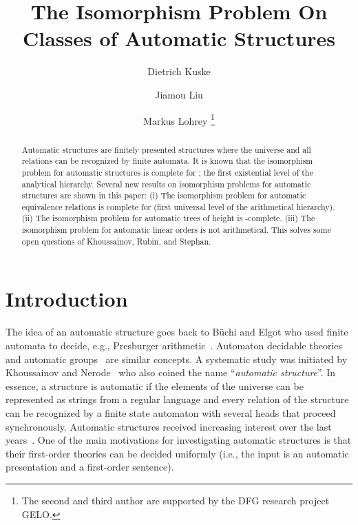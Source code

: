 \documentclass[envcountsame]{llncs}
\begin{document}
\title{The Isomorphism Problem On Classes of Automatic Structures}
\author{Dietrich Kuske \and Jiamou Liu \and  Markus Lohrey
\thanks{The second and third author are supported by the DFG  research project GELO.}
}

\maketitle
\pagestyle{plain}

\begin{abstract}
Automatic structures are finitely presented structures
where the universe and all relations can be recognized by finite automata.
It is known that
the isomorphism problem for automatic structures is complete for ;
the first existential level of the analytical hierarchy.
Several new results on isomorphism problems for automatic structures are shown in this paper:
(i) The isomorphism problem for automatic equivalence relations is complete for 
(first universal level of the arithmetical hierarchy).
(ii) The isomorphism problem for automatic trees of height  is
 -complete.
(iii) The isomorphism problem for automatic linear orders is not arithmetical.
This solves some open questions of Khoussainov, Rubin, and Stephan. 
\end{abstract}


\section{Introduction}

The idea of an automatic structure goes back to B\"uchi and Elgot who
used finite automata to decide, e.g., Presburger
arithmetic~\cite{Elg61}. Automaton decidable theories~\cite{Hod82}
and automatic groups~\cite{EpsCHLPT92} are similar concepts. A
systematic study was initiated by Khoussainov and Nerode~\cite{KhoN95}
who also coined the name ``{\em automatic structure}''.
In essence, a structure is automatic if the elements of the universe can be
represented as strings from a regular language and every relation of the structure
can be recognized by a finite state automaton with several heads that
proceed synchronously.  Automatic structures received
increasing interest over the last
years~\cite{BarKR08,BluG04,IsKhRu02,KhoNRS07,KhoRS05,KusLo09JSL,Rub08}.
One of the main motivations for investigating automatic structures is that
their first-order theories can be decided uniformly (i.e., the input
is an automatic presentation and a first-order sentence).
\end{document}
